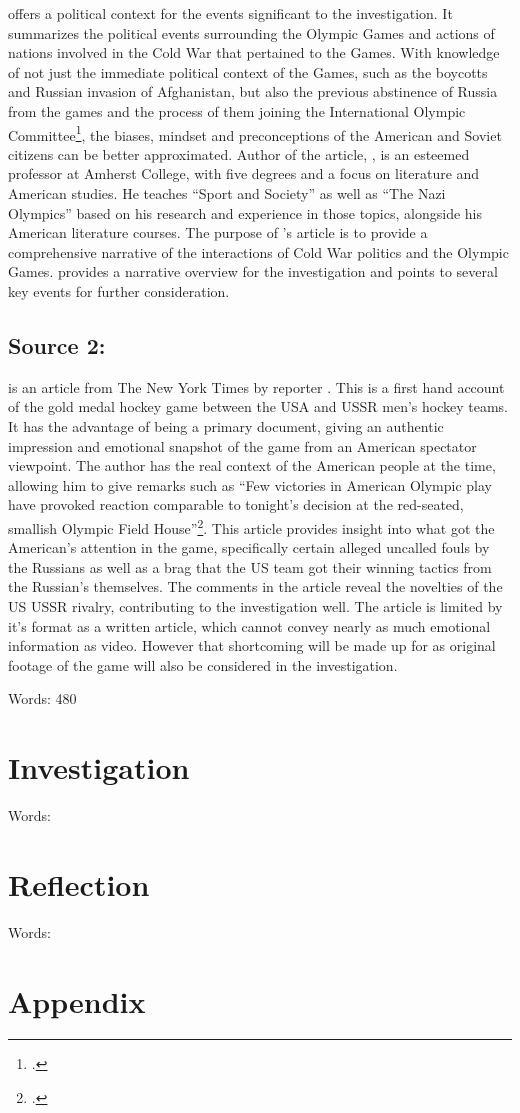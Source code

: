 \documentclass[12pt,letterpaper]{article}
\begin{document}
 offers a political context for the events significant to the investigation. It summarizes the political events surrounding the Olympic Games and actions of nations involved in the Cold War that pertained to the Games. With knowledge of not just the immediate political context of the Games, such as the boycotts and Russian invasion of Afghanistan, but also the previous abstinence of Russia from the games and the process of them joining the International Olympic Committee\footcite[555-558]{guttmann}, the biases, mindset and preconceptions of the American and Soviet citizens can be better approximated. Author of the article, \citeauthor{guttmann}, is an esteemed professor at Amherst College, with five degrees and a focus on literature and American studies. He teaches ``Sport and Society'' as well as ``The Nazi Olympics'' based on his research and experience in those topics, alongside his American literature courses. The purpose of \citeauthor{guttmann}'s article is to provide a comprehensive narrative of the interactions of Cold War politics and the Olympic Games.  provides a narrative overview for the investigation and points to several key events for further consideration. 

\subsection{Source 2: }

 is an article from The New York Times by reporter \citeauthor{miracleonice}. This is a first hand account of the gold medal hockey game between the USA and USSR men's hockey teams. It has the advantage of being a primary document, giving an authentic impression and emotional snapshot of the game from an American spectator viewpoint. The author has the real context of the American people at the time, allowing him to give remarks such as ``Few victories in American Olympic play have provoked reaction comparable to tonight's decision at the red-seated, smallish Olympic Field House''\footcite{miracleonice}. This article provides insight into what got the American's attention in the game, specifically certain alleged uncalled fouls by the Russians as well as a brag that the US team got their winning tactics from the Russian's themselves. The comments in the article reveal the novelties of the US USSR rivalry, contributing to the investigation well. The article is limited by it's format as a written article, which cannot convey nearly as much emotional information as video. However that shortcoming will be made up for as original footage of the game will also be considered in the investigation. 

Words: 480

\section{Investigation}


Words: 

\section{Reflection}


Words:

\newpage
\printbibliography

\newpage
\section{Appendix}
\listoffigures
\end{document}
